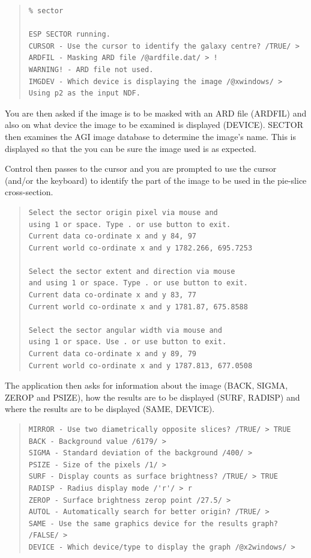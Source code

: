\documentclass[twoside,11pt]{article}
\newenvironment{myquote}{\begin{quote}\begin{small}}{\end{small}\end{quote}}
\begin{document}
\begin{myquote}
\begin{verbatim}
% sector
 
ESP SECTOR running.
CURSOR - Use the cursor to identify the galaxy centre? /TRUE/ > 
ARDFIL - Masking ARD file /@ardfile.dat/ > !
WARNING! - ARD file not used.
IMGDEV - Which device is displaying the image /@xwindows/ > 
Using p2 as the input NDF.
\end{verbatim}
\end{myquote}
 
You are then asked if the image is to be masked with an ARD file (ARDFIL)
and also on what device the image to be examined is displayed (DEVICE).
SECTOR then examines the AGI image database to determine the image's name.
This is displayed so that the you can be sure the image used is as expected.

Control then passes to the cursor and you are prompted to use the
cursor (and/or the keyboard) to identify the part of the image to be used in
the pie-slice cross-section.

\begin{myquote}
\begin{verbatim}
Select the sector origin pixel via mouse and
using 1 or space. Type . or use button to exit.
Current data co-ordinate x and y 84, 97
Current world co-ordinate x and y 1782.266, 695.7253
 
Select the sector extent and direction via mouse
and using 1 or space. Type . or use button to exit.
Current data co-ordinate x and y 83, 77
Current world co-ordinate x and y 1781.87, 675.8588
 
Select the sector angular width via mouse and
using 1 or space. Use . or use button to exit.
Current data co-ordinate x and y 89, 79
Current world co-ordinate x and y 1787.813, 677.0508
\end{verbatim}
\end{myquote}

The application then asks for information about the image (BACK,
SIGMA, ZEROP and PSIZE), how the results are to be displayed (SURF, RADISP)
and where the results are to be displayed (SAME, DEVICE).

\begin{myquote}
\begin{verbatim}
MIRROR - Use two diametrically opposite slices? /TRUE/ > TRUE
BACK - Background value /6179/ > 
SIGMA - Standard deviation of the background /400/ > 
PSIZE - Size of the pixels /1/ > 
SURF - Display counts as surface brightness? /TRUE/ > TRUE
RADISP - Radius display mode /'r'/ > r
ZEROP - Surface brightness zerop point /27.5/ > 
AUTOL - Automatically search for better origin? /TRUE/ > 
SAME - Use the same graphics device for the results graph? /FALSE/ > 
DEVICE - Which device/type to display the graph /@x2windows/ > 
\end{verbatim}
\end{myquote}
 
\end{document}
